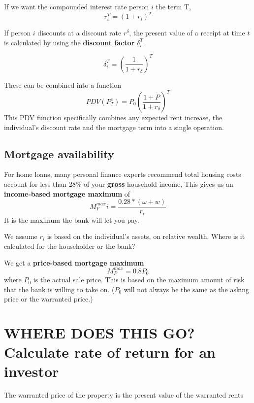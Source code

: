If we want the compounded interest rate person $i$ the term T,
\[r_i^T=(1+r_i)^T\]

If person $i$  discounts at a discount rate $r^\delta$, the present value of a receipt at time $t$ is calculated by using the \textbf{discount factor} $\delta_i^T$.

\[\delta_i^T= \left( \frac{1}{1+r_\delta} \right)^T \]
 
These can be combined into a function %
\[ PDV(P^e_T)=P_0\left( \frac{1+\dot P}{1+r_\delta} \right)^T \]
This PDV function specifically combines any expected rent increase, the individual's discount rate and the mortgage term into a single operation.

\subsection{Mortgage availability}
For home loans, many personal finance experts recommend total housing costs account for less than 28\% of your \textbf{gross} household income, This gives us an \textbf{income-based  mortgage maximum} of \[M^{max}_Yi = \frac{0.28*(\omega+w)}{r_i}\] It is the maximum the bank will let you pay.

We assume $r_i$ is based on the individual's assets, on relative wealth. Where is it calculated for the householder or the bank?

We get a \textbf{price-based mortgage maximum} \[M^{max}_P = 0.8P_0\] where $P_0$ is the actual sale price. This is based on the maximum amount of risk that the bank is willing to take on. ($P_0$  will not always be the same as the asking price or the warranted price.)



\section{WHERE DOES THIS GO? Calculate rate of return for an investor}

 The warranted price of the property is the present value of the \gls{warranted rents}%

